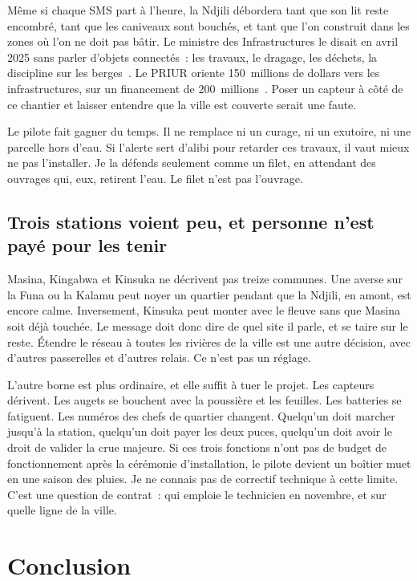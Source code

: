 \documentclass[12pt,a4paper]{article}
\begin{document}
Même si chaque SMS part à l'heure, la Ndjili débordera tant que son lit reste encombré, tant que les caniveaux sont bouchés, et tant que l'on construit dans les zones où l'on ne doit pas bâtir. Le ministre des Infrastructures le disait en avril 2025 sans parler d'objets connectés~: les travaux, le dragage, les déchets, la discipline sur les berges~\cite{conseil2025}. Le PRIUR oriente 150~millions de dollars vers les infrastructures, sur un financement de 200~millions~\cite{priur2026}. Poser un capteur à côté de ce chantier et laisser entendre que la ville est couverte serait une faute.

Le pilote fait gagner du temps. Il ne remplace ni un curage, ni un exutoire, ni une parcelle hors d'eau. Si l'alerte sert d'alibi pour retarder ces travaux, il vaut mieux ne pas l'installer. Je la défends seulement comme un filet, en attendant des ouvrages qui, eux, retirent l'eau. Le filet n'est pas l'ouvrage.

\subsection{Trois stations voient peu, et personne n'est payé pour les tenir}

Masina, Kingabwa et Kinsuka ne décrivent pas treize communes. Une averse sur la Funa ou la Kalamu peut noyer un quartier pendant que la Ndjili, en amont, est encore calme. Inversement, Kinsuka peut monter avec le fleuve sans que Masina soit déjà touchée. Le message doit donc dire de quel site il parle, et se taire sur le reste. Étendre le réseau à toutes les rivières de la ville est une autre décision, avec d'autres passerelles et d'autres relais. Ce n'est pas un réglage.

L'autre borne est plus ordinaire, et elle suffit à tuer le projet. Les capteurs dérivent. Les augets se bouchent avec la poussière et les feuilles. Les batteries se fatiguent. Les numéros des chefs de quartier changent. Quelqu'un doit marcher jusqu'à la station, quelqu'un doit payer les deux puces, quelqu'un doit avoir le droit de valider la crue majeure. Si ces trois fonctions n'ont pas de budget de fonctionnement après la cérémonie d'installation, le pilote devient un boîtier muet en une saison des pluies. Je ne connais pas de correctif technique à cette limite. C'est une question de contrat~: qui emploie le technicien en novembre, et sur quelle ligne de la ville.

\clearpage
\section{Conclusion}
\end{document}
